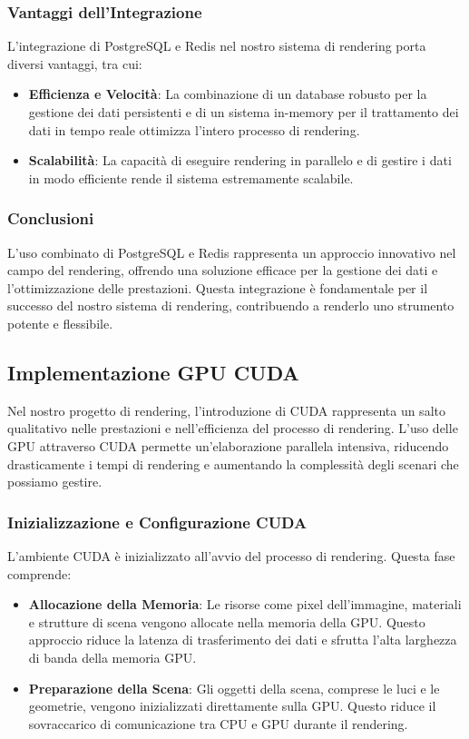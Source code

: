 \documentclass[12pt]{article}
\begin{document}
\subsubsection{Vantaggi dell'Integrazione}
L'integrazione di PostgreSQL e Redis nel nostro sistema di rendering porta diversi vantaggi, tra cui:

\begin{itemize}
\item \textbf{Efficienza e Velocità}: La combinazione di un database robusto per la gestione dei dati persistenti e di un sistema in-memory per il trattamento dei dati in tempo reale ottimizza l'intero processo di rendering.

\item \textbf{Scalabilità}: La capacità di eseguire rendering in parallelo e di gestire i dati in modo efficiente rende il sistema estremamente scalabile.
\end{itemize}

\subsubsection{Conclusioni}
L'uso combinato di PostgreSQL e Redis rappresenta un approccio innovativo nel campo del rendering, offrendo una soluzione efficace per la gestione dei dati e l'ottimizzazione delle prestazioni. Questa integrazione è fondamentale per il successo del nostro sistema di rendering, contribuendo a renderlo uno strumento potente e flessibile.

\subsection{Implementazione GPU CUDA}

Nel nostro progetto di rendering, l'introduzione di CUDA rappresenta un salto qualitativo nelle prestazioni e nell'efficienza del processo di rendering. L'uso delle GPU attraverso CUDA permette un'elaborazione parallela intensiva, riducendo drasticamente i tempi di rendering e aumentando la complessità degli scenari che possiamo gestire.

\subsubsection{Inizializzazione e Configurazione CUDA}
L'ambiente CUDA è inizializzato all'avvio del processo di rendering. Questa fase comprende:

\begin{itemize}
\item \textbf{Allocazione della Memoria}: Le risorse come pixel dell'immagine, materiali e strutture di scena vengono allocate nella memoria della GPU. Questo approccio riduce la latenza di trasferimento dei dati e sfrutta l'alta larghezza di banda della memoria GPU.
\item \textbf{Preparazione della Scena}: Gli oggetti della scena, comprese le luci e le geometrie, vengono inizializzati direttamente sulla GPU. Questo riduce il sovraccarico di comunicazione tra CPU e GPU durante il rendering.
\end{itemize}
\end{document}
